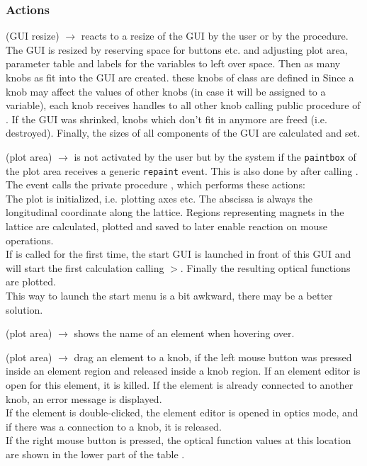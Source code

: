 \documentclass[12pt]{article}
\newcommand\code[1]{{\tt #1}}
\newcommand{\ofldx}[1]{\colorbox{black!15}{{\color{black}(#1)}}}
\newcommand\guico[1]{{\color{blue}\code{#1}}}
\newcommand\guifco[1]{{\color{violet}\code{#1}}}
\newcommand{\unico}[1]{{\color{burntorange}\code{#1}}}
\newcommand{\evcodx}[2]{\ofldx{#1} $\rightarrow$ \guico{#2}}
\newcommand{\prcod}[2]{\opauni{#1}$>$\unico{#2}}
\newcommand{\opagui}[1]{\colorbox{blue!20}{{\color{black}\code{#1}}}}
\newcommand{\ogui}[1]{\hyperref[#1]{\opagui{#1}}}
\newcommand{\opaguif}[1]{\colorbox{violet!30}{{\color{black}\code{#1}}}}
\newcommand{\oguif}[1]{\hyperref[#1]{\opaguif{#1}}}
\newcommand{\opauni}[1]{\colorbox{orange!30}{{\color{black}\code{#1}}}}
\newcommand{\act}[1]{\subsubsection*{Actions} #1}
\newcommand{\todo}[1]{{\color{red} #1}}
\begin{document}
\act{
\evcodx{GUI resize}{FormResize} reacts to a resize of the GUI by the user or by the \guico{Init} procedure. The GUI is resized by reserving space for buttons etc. and adjusting plot area, parameter table and labels for the variables to left over space.
Then as many knobs as fit into the GUI are created. these knobs of class 
\guifco{TKnob} are defined in   Since a knob may affect the values of other knobs (in case it will be assigned to a variable), each knob receives handles to all other knob calling public procedure \guifco{BrotherHandles} of \oguif{knobframe}. If the GUI was shrinked, knobs which don't fit in anymore are freed (i.e. destroyed). Finally, the sizes of all components of the GUI are calculated and set.

\evcodx{plot area}{pwpaint} is not activated by the user but by the system if the \code{paintbox} of the plot area receives a generic \code{repaint} event. This is also done by \ogui{opamenu} after calling \guico{Init}. The event calls the private procedure \guico{MakePlot}, which performs these actions:\\
The plot is initialized, i.e. plotting axes etc. The abscissa is always the longitudinal coordinate along the lattice. Regions representing magnets in the lattice are calculated, plotted and saved to later enable reaction on mouse operations.\\
If \guico{MakePlot} is called for the first time, the start GUI \ogui{ostartmenu} is launched in front of this GUI and will start the first calculation calling \prcod{linoplib}{OpticCalc}. Finally the resulting optical functions are plotted.\\ \todo{This way to launch the start menu is a bit awkward, there may be a better solution.}

\evcodx{plot area}{pwMouseMove} shows the name of an element when hovering over.

\evcodx{plot area}{pwMouseDown, pwMouseUp} drag an element to a knob, if the left mouse button was pressed inside an element region and released inside a knob region. If an element editor \ogui{oeleedit} is open for this element, it is killed. If the element is already connected to another knob, an error message is displayed.\\
If the element is double-clicked, the element editor \ogui{oeleedit} is opened in optics mode, and if there was a connection to a knob, it is released.\\
If the right mouse button is pressed, the optical function values at this location are shown in the lower part of the table \guico{tab}.

}
\end{document}
